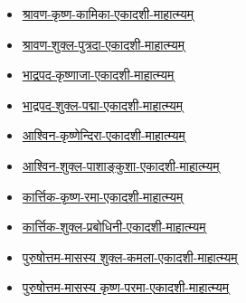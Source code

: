 {\begin{center}
\begin{itemize}
        \item \hyperref[sec:vrata-raja-shravana-krishna-kamika]{श्रावण-कृष्ण-कामिका-एकादशी-माहात्म्यम्}
        \item \hyperref[sec:vrata-raja-shravana-shukla-putrada]{श्रावण-शुक्ल-पुत्रदा-एकादशी-माहात्म्यम्}
        \item \hyperref[sec:vrata-raja-bhadrapada-krishnaja]{भाद्रपद-कृष्णाजा-एकादशी-माहात्म्यम्}
        \item \hyperref[sec:vrata-raja-bhadrapada-shukla-padma]{भाद्रपद-शुक्ल-पद्मा-एकादशी-माहात्म्यम्}
        \item \hyperref[sec:vrata-raja-ashvina-krishnendira]{आश्विन-कृष्णेन्दिरा-एकादशी-माहात्म्यम्}
        \item \hyperref[sec:vrata-raja-ashvina-shukla-pashankusha]{आश्विन-शुक्ल-पाशाङ्कुशा-एकादशी-माहात्म्यम्}
        \item \hyperref[sec:vrata-raja-karttika-krishna-rama]{कार्त्तिक-कृष्ण-रमा-एकादशी-माहात्म्यम्}
        \item \hyperref[sec:vrata-raja-karttika-shukla-prabodhini]{कार्त्तिक-शुक्ल-प्रबोधिनी-एकादशी-माहात्म्यम्}
        \item \hyperref[sec:vrata-raja-purushottama-shukla-kamala]{पुरुषोत्तम-मासस्य शुक्ल-कमला-एकादशी-माहात्म्यम्}
        \item \hyperref[sec:vrata-raja-purushottama-krishna-parama]{पुरुषोत्तम-मासस्य कृष्ण-परमा-एकादशी-माहात्म्यम्}
    \end{itemize}
    \clearpage
    
\end{center}
}{}
